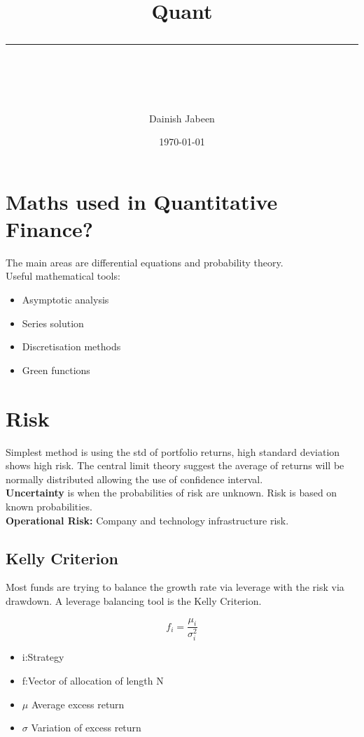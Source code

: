 \documentclass[11pt]{scrartcl} %
\title{	
	\normalfont\normalsize
	\vspace{20pt} %
	{\huge Quant}\\ %
	\vspace{12pt} %
	\rule{\linewidth}{2pt}\\ %
}
\author{\small Dainish Jabeen} %
\date{\normalsize\today} %
\begin{document}
\maketitle %

\section{Maths used in Quantitative Finance?}

The main areas are differential equations and probability theory.\\

Useful mathematical tools:

\begin{itemize}
	\item Asymptotic analysis
	\item Series solution
	\item Discretisation methods
	\item Green functions
\end{itemize}

\section{Risk}

Simplest method is using the std of portfolio returns, high standard deviation shows high risk. 
The central limit theory suggest the average of returns will be normally distributed allowing 
the use of confidence interval.\\

\textbf{Uncertainty} is when the probabilities of risk are unknown. 
Risk is based on known probabilities.\\

\textbf{Operational Risk:} Company and technology infrastructure risk.

\subsection{Kelly Criterion}

Most funds are trying to balance the growth rate via leverage with the risk via drawdown. 
A leverage balancing tool is the Kelly Criterion.

\[ f_i = \frac{\mu_i}{\sigma_i^2} \]

\begin{itemize}
	\item i:Strategy
	\item f:Vector of allocation of length N
	\item $\mu$ Average excess return
	\item $\sigma$ Variation of excess return
\end{itemize}
\end{document}
